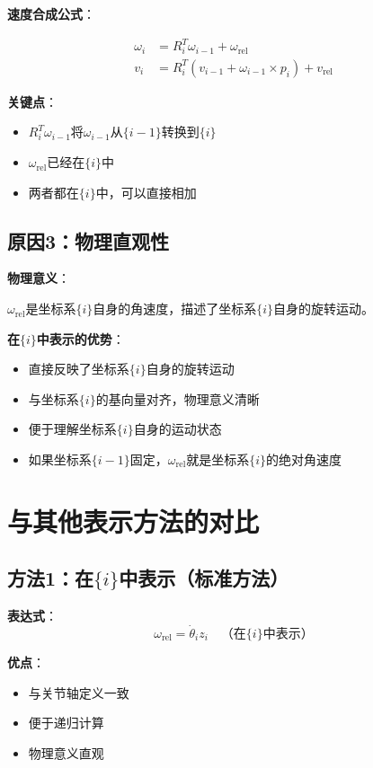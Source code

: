 \documentclass[12pt,a4paper]{article}
\begin{document}
\textbf{速度合成公式}：

\begin{align}
\omega_i &= R_i^T \omega_{i-1} + \omega_{\text{rel}} \\
v_i &= R_i^T (v_{i-1} + \omega_{i-1} \times p_i) + v_{\text{rel}}
\end{align}

\textbf{关键点}：

\begin{itemize}
\item $R_i^T \omega_{i-1}$将$\omega_{i-1}$从$\{i-1\}$转换到$\{i\}$
\item $\omega_{\text{rel}}$已经在$\{i\}$中
\item 两者都在$\{i\}$中，可以直接相加
\end{itemize}

\subsection{原因3：物理直观性}

\textbf{物理意义}：

$\omega_{\text{rel}}$是坐标系$\{i\}$自身的角速度，描述了坐标系$\{i\}$自身的旋转运动。

\textbf{在$\{i\}$中表示的优势}：

\begin{itemize}
\item 直接反映了坐标系$\{i\}$自身的旋转运动
\item 与坐标系$\{i\}$的基向量对齐，物理意义清晰
\item 便于理解坐标系$\{i\}$自身的运动状态
\item 如果坐标系$\{i-1\}$固定，$\omega_{\text{rel}}$就是坐标系$\{i\}$的绝对角速度
\end{itemize}

\section{与其他表示方法的对比}

\subsection{方法1：在$\{i\}$中表示（标准方法）}

\textbf{表达式}：
\begin{equation}
\omega_{\text{rel}} = \dot{\theta}_i z_i \quad \text{（在$\{i\}$中表示）}
\end{equation}

\textbf{优点}：
\begin{itemize}
\item 与关节轴定义一致
\item 便于递归计算
\item 物理意义直观
\end{itemize}
\end{document}
